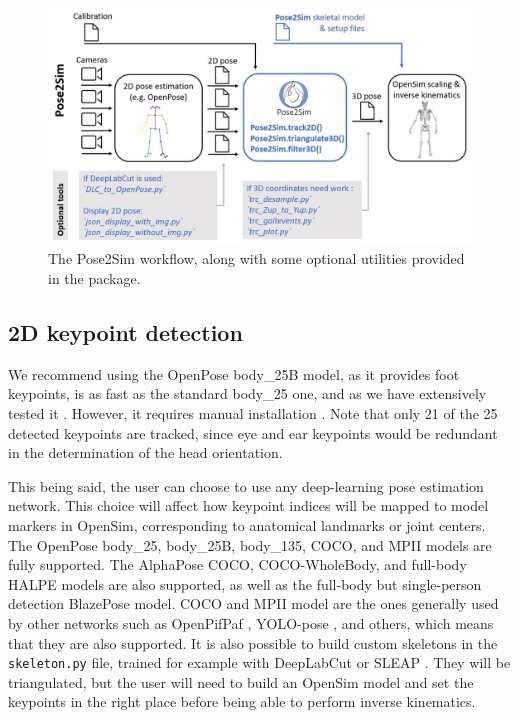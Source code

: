 \begin{figure}[hbtp]
	\centering
	\def\svgwidth{1\columnwidth}
	\fontsize{10pt}{10pt}\selectfont
	\includegraphics[width=\linewidth]{"../Chap3/Figures/Fig_Pose2SimUtilities.jpg"}
	\caption{The Pose2Sim workflow, along with some optional utilities provided in the package.}
	\label{fig_opensimutilities}
\end{figure}


\subsection{2D keypoint detection}

We recommend using the OpenPose body\_25B model, as it provides foot keypoints, is as fast as the standard body\_25 one, and as we have extensively tested it \cite{Pagnon2022a}. However, it requires manual installation \cite{Hidalgo2021}. Note that only 21 of the 25 detected keypoints are tracked, since eye and ear keypoints would be redundant in the determination of the head orientation. 

This being said, the user can choose to use any deep-learning pose estimation network. This choice will affect how keypoint indices will be mapped to model markers in OpenSim, corresponding to anatomical landmarks or joint centers. The OpenPose body\_25, body\_25B, body\_135, COCO, and MPII models are fully supported. The AlphaPose COCO, COCO-WholeBody, and full-body HALPE models are also supported, as well as the full-body but single-person detection BlazePose model. COCO and MPII model are the ones generally used by other networks such as OpenPifPaf \cite{Kreiss2021}, YOLO-pose \cite{Maji2022, Wang2022b}, and others, which means that they are also supported. It is also possible to build custom skeletons in the \texttt{skeleton.py} file, trained for example with DeepLabCut \cite{Mathis2018, Lauer2022} or SLEAP \cite{Pereira2022}. They will be triangulated, but the user will need to build an OpenSim model and set the keypoints in the right place before being able to perform inverse kinematics.

